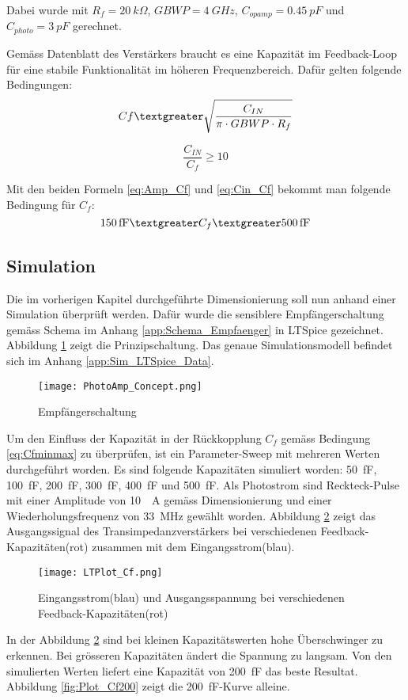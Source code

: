 Dabei wurde mit $R_{f}=\SI{20}{k\Omega}$, $GBWP=\SI{4}{GHz}$, $C_{opamp}=\SI{0.45}{pF}$ und $C_{photo}=\SI{3}{pF}$ gerechnet.

Gemäss Datenblatt \cite{ltc6268} des Verstärkers braucht es eine Kapazität im Feedback-Loop für eine stabile Funktionalität im höheren Frequenzbereich. Dafür gelten folgende Bedingungen:
\begin{equation}\label{eq:Amp_Cf}
C{f}\textgreater \sqrt{\frac{C_{IN}}{\pi\cdot GBWP\cdot R_{f}}}
\end{equation}

\begin{equation}\label{eq:Cin_Cf}
\frac{C_{IN}}{C_{f}}\geq 10
\end{equation}

Mit den beiden Formeln \ref{eq:Amp_Cf} und \ref{eq:Cin_Cf} bekommt man folgende Bedingung für $C_{f}$: 
\begin{equation}\label{eq:Cfminmax}
\SI{150}{fF}\textgreater C_{f}\textgreater \SI{500}{fF}
\end{equation}

\subsection{Simulation}
Die im vorherigen Kapitel durchgeführte Dimensionierung soll nun anhand einer Simulation überprüft werden.
Dafür wurde die sensiblere Empfängerschaltung gemäss Schema im Anhang \ref{app:Schema_Empfaenger} in LTSpice gezeichnet. Abbildung \ref{fig:PhotoAmp_Concept} zeigt die Prinzipschaltung. Das genaue Simulationsmodell befindet sich im Anhang \ref{app:Sim_LTSpice_Data}.
\begin{figure}[H]
	\centering
	\texttt{[image: PhotoAmp\_Concept.png]}
	\caption{Empfängerschaltung}\label{fig:PhotoAmp_Concept}
\end{figure}

Um den Einfluss der Kapazität in der Rückkopplung $C_{f}$ gemäss Bedingung \ref{eq:Cfminmax} zu überprüfen, ist ein Parameter-Sweep mit mehreren Werten durchgeführt worden. Es sind folgende Kapazitäten simuliert worden: \SI{50}{fF}, \SI{100}{fF}, \SI{200}{fF}, \SI{300}{fF}, \SI{400}{fF} und \SI{500}{fF}. Als Photostrom sind Reckteck-Pulse mit einer Amplitude von \SI{10}{\mu A} gemäss Dimensionierung und einer Wiederholungsfrequenz von \SI{33}{MHz} gewählt worden.
Abbildung \ref{fig:Plot_Cf} zeigt das Ausgangssignal des Transimpedanzverstärkers bei verschiedenen Feedback-Kapazitäten(rot) zusammen mit dem Eingangsstrom(blau).
\begin{figure}[H]
	\centering
	\texttt{[image: LTPlot\_Cf.png]}
	\caption{Eingangsstrom(blau) und Ausgangsspannung bei verschiedenen Feedback-Kapazitäten(rot)}\label{fig:Plot_Cf}
\end{figure}
In der Abbildung \ref{fig:Plot_Cf} sind bei kleinen Kapazitätswerten hohe Überschwinger zu erkennen. Bei grösseren Kapazitäten ändert die Spannung zu langsam. Von den simulierten Werten liefert eine Kapazität von \SI{200}{fF} das beste Resultat. Abbildung \ref{fig:Plot_Cf200} zeigt die \SI{200}{fF}-Kurve alleine.

